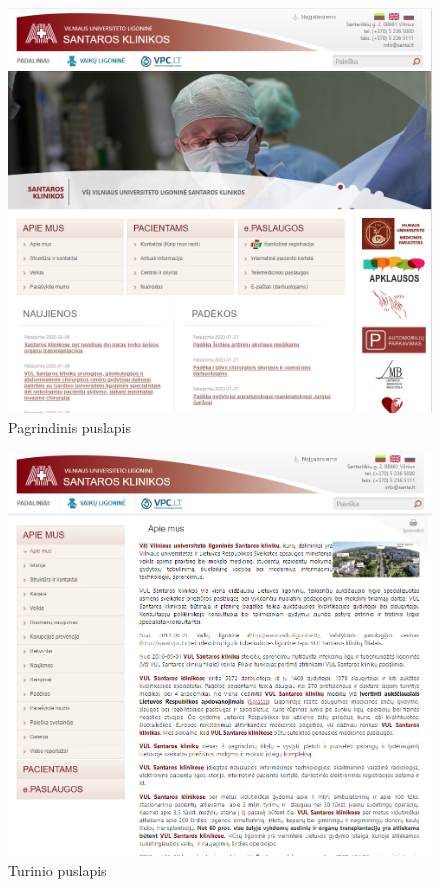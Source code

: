 \documentclass{VUMIFPSbakalaurinis}
\begin{document}
\appendix  %

\begin{figure}[H]
    \centering
    \includegraphics[scale=0.65]{img/Pagrindinis}
    \caption{Pagrindinis puslapis}
    \label{img:PagrindinisPuslapis}
\end{figure}
\begin{figure}[H]
    \centering
    \includegraphics[scale=0.65]{img/Turinys}
    \caption{Turinio puslapis}
    \label{img:TurinysPuslapis}
\end{figure}
\end{document}
